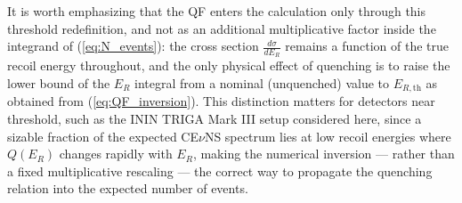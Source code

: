 It is worth emphasizing that the QF enters the calculation only through this threshold redefinition, and not as an additional multiplicative factor inside the integrand of (\ref{eq:N_events}): the cross section $\frac{d\sigma}{dE_R}$ remains a function of the true recoil energy throughout, and the only physical effect of quenching is to raise the lower bound of the $E_R$ integral from a nominal (unquenched) value to $E_{R,\text{th}}$ as obtained from (\ref{eq:QF_inversion}). This distinction matters for detectors near threshold, such as the ININ TRIGA Mark III setup considered here, since a sizable fraction of the expected CE$\nu$NS spectrum lies at low recoil energies where $Q(E_R)$ changes rapidly with $E_R$, making the numerical inversion — rather than a fixed multiplicative rescaling — the correct way to propagate the quenching relation into the expected number of events.